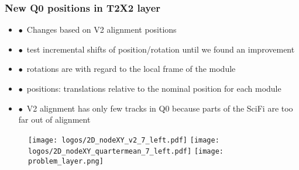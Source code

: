 \documentclass[aspectratio=1610, 12pt, xcolor=dvipsnames]{beamer}
\begin{document}
\begin{frame}\frametitle{New Q0 positions in T2X2 layer}
  \begin{itemize}
    \item $\bullet$\, Changes based on V2 alignment positions
    \item $\bullet$\, test incremental shifts of position/rotation until we found an improvement
    \item $\bullet$\, rotations are with regard to the local frame of the module
    \item $\bullet$\, positions: translations relative to the nominal position for each module
    \item $\bullet$\, V2 alignment has only few tracks in Q0 because parts of the SciFi are too far out of alignment
  \end{itemize}
  \begin{figure}
    \texttt{[image: logos/2D\_nodeXY\_v2\_7\_left.pdf]}%
    \texttt{[image: logos/2D\_nodeXY\_quartermean\_7\_left.pdf]}%
    \texttt{[image: problem\_layer.png]}%
  \end{figure}
\end{frame}

\end{document}
